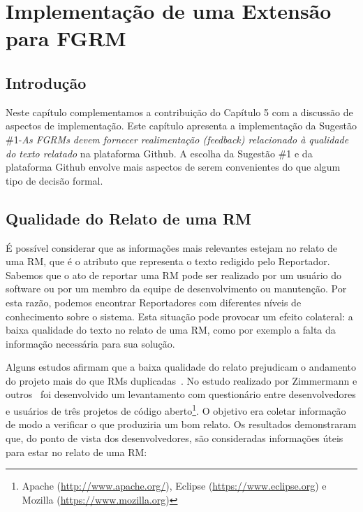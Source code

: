 \chapter{Implementação de uma Extensão para FGRM}
\label{ch:implemtacao_extensao}

\section{Introdução}
\label{sec:implemtacao_extensao_intro}

Neste capítulo complementamos a contribuição do Capítulo 5 com a discussão de
aspectos de implementação. Este capítulo apresenta a implementação da Sugestão
\#1\@-\@\textit{As FGRMs devem fornecer realimentação (feedback) relacionado à
    qualidade do texto relatado} na plataforma Github. A escolha da Sugestão
\#1 e da plataforma Github envolve mais aspectos de serem convenientes do que
algum tipo de decisão formal.

\section{Qualidade do Relato de uma RM}
\label{sec:avaliando_a_qualidade_do_relato_de_uma_rm}

É possível considerar que as informações mais relevantes estejam no relato de
uma RM, que é o atributo que representa o texto redigido pelo Reportador.
Sabemos que o ato de reportar uma RM pode ser realizado por um usuário do
software ou por um membro da equipe de desenvolvimento ou manutenção. Por esta
razão, podemos encontrar Reportadores com diferentes níveis de conhecimento
sobre o sistema. Esta situação pode provocar um efeito colateral: a baixa
qualidade do texto no relato de uma RM, como por exemplo a falta da informação
necessária para sua solução.

Alguns estudos afirmam que a baixa qualidade do relato prejudicam o andamento do
projeto mais do que RMs duplicadas~\cite{bettenburg2007quality}. No estudo
realizado por Zimmermann e outros~\cite{zimmermann2010makes} foi desenvolvido
um levantamento com questionário entre desenvolvedores e usuários de três
projetos de código aberto\footnote{Apache (\url{http://www.apache.org/}),
    Eclipse (\url{https://www.eclipse.org}) e Mozilla
    (\url{https://www.mozilla.org})}.  O objetivo era coletar informação de
modo a verificar o que produziria um bom relato. Os resultados demonstraram
que, do ponto de vista dos desenvolvedores, são consideradas informações úteis
para estar no relato de uma RM\@:

